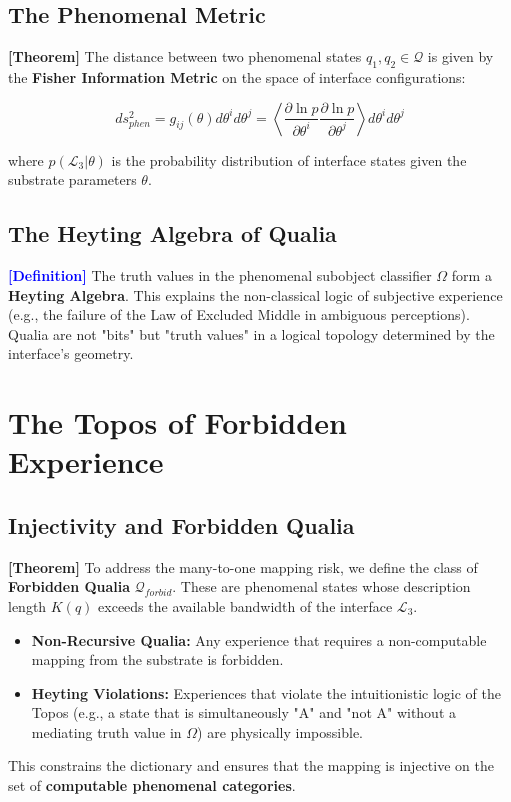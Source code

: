\documentclass[11pt,titlepage]{article}
\newcommand{\interface}{\mathcal{L}_3}
\newcommand{\classifier}{\Omega}
\newcommand{\tagdef}{\textcolor{blue}{\textbf{[Definition]}} }
\newcommand{\tagtheo}{\textcolor{green!60!black}{\textbf{[Theorem]}} }
\begin{document}
\subsection{The Phenomenal Metric}
\tagtheo The distance between two phenomenal states $q_1, q_2 \in \mathcal{Q}$ is given by the \textbf{Fisher Information Metric} on the space of interface configurations:

\begin{equation}
ds^2_{phen} = g_{ij}(\theta) d\theta^i d\theta^j = \left\langle \frac{\partial \ln p}{\partial \theta^i} \frac{\partial \ln p}{\partial \theta^j} \right\rangle d\theta^i d\theta^j
\end{equation}

where $p(\interface | \theta)$ is the probability distribution of interface states given the substrate parameters $\theta$.

\subsection{The Heyting Algebra of Qualia}
\tagdef The truth values in the phenomenal subobject classifier $\classifier$ form a \textbf{Heyting Algebra}. This explains the non-classical logic of subjective experience (e.g., the failure of the Law of Excluded Middle in ambiguous perceptions). Qualia are not "bits" but "truth values" in a logical topology determined by the interface's geometry.


\section{The Topos of Forbidden Experience}

\subsection{Injectivity and Forbidden Qualia}
\tagtheo To address the many-to-one mapping risk, we define the class of \textbf{Forbidden Qualia} $\mathcal{Q}_{forbid}$. These are phenomenal states whose description length $K(q)$ exceeds the available bandwidth of the interface $\interface$.
\begin{itemize}
    \item \textbf{Non-Recursive Qualia:} Any experience that requires a non-computable mapping from the substrate is forbidden.
    \item \textbf{Heyting Violations:} Experiences that violate the intuitionistic logic of the Topos (e.g., a state that is simultaneously "A" and "not A" without a mediating truth value in $\classifier$) are physically impossible.
\end{itemize}
This constrains the dictionary and ensures that the mapping is injective on the set of \textbf{computable phenomenal categories}.
\end{document}
